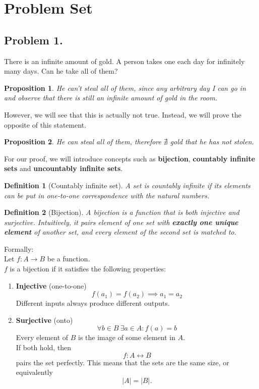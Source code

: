 \documentclass{article}
\newtheorem*{proposition}{Proposition}
\newtheorem*{definition}{Definition}
\begin{document}
\section{Problem Set}
\subsection{Problem 1.}
There is an infinite amount of gold. A person takes one each day for infinitely many days. Can he take all of them?

\begin{proposition}
  He can't steal all of them, since any arbitrary day I can go in and observe that there is still an infinite amount of gold in the room.
\end{proposition}
However, we will see that this is actually not true. Instead, we will prove the opposite of this statement.
\begin{proposition}
    He can steal all of them, therefore $\nexists$ gold that he has not stolen.
\end{proposition}

For our proof, we will introduce concepts such as \textbf{bijection}, \textbf{countably infinite sets} and \textbf{uncountably infinite sets}.
\begin{definition}[Countably infinite set]
    A set is countably infinite if its elements can be put in one-to-one correspondence with the natural numbers.
\end{definition}

\begin{definition}[Bijection]
    A bijection is a function that is both injective and surjective. Intuitively, it pairs element of one set with \textbf{exactly one unique element} of another set, and every element of the second set is matched to.
\end{definition}
    Formally:\\
    Let $f : A \rightarrow B$ be a function.\\
    $f$ is a bijection if it satisfies the following properties:
    \begin{enumerate}
        \item \textbf{Injective} (one-to-one)
        \[
            f(a_1) = f(a_2) \implies a_1 = a_2
        \]
        Different inputs always produce different outputs.
        \item \textbf{Surjective} (onto)
        \[
            \forall b \in B \: \exists a \in A : f(a) = b
        \]
        Every element of $B$ is the image of some element in $A$.\\
        If both hold, then
        \[
        f : A \leftrightarrow B
        \]
        pairs the set perfectly. This means that the sets are the same size, or equivalently
        \[
        |A| = |B|.
        \]
    \end{enumerate}
\end{document}
